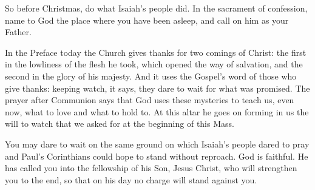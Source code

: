 So before Christmas, do what Isaiah's people did. In the sacrament of
confession, name to God the place where you have been asleep, and call on
him as your Father.

\bigskip

In the Preface today the Church gives thanks for two comings of Christ: the
first in the lowliness of the flesh he took, which opened the way of
salvation, and the second in the glory of his majesty. And it uses the
Gospel's word of those who give thanks: keeping watch, it says, they dare to
wait for what was promised. The prayer after Communion says that God uses
these mysteries to teach us, even now, what to love and what to hold to. At
this altar he goes on forming in us the will to watch that we asked for at
the beginning of this Mass.

You may dare to wait on the same ground on which Isaiah's people dared to
pray and Paul's Corinthians could hope to stand without reproach. God is
faithful. He has called you into the fellowship of his Son, Jesus Christ,
who will strengthen you to the end, so that on his day no charge will stand
against you.
